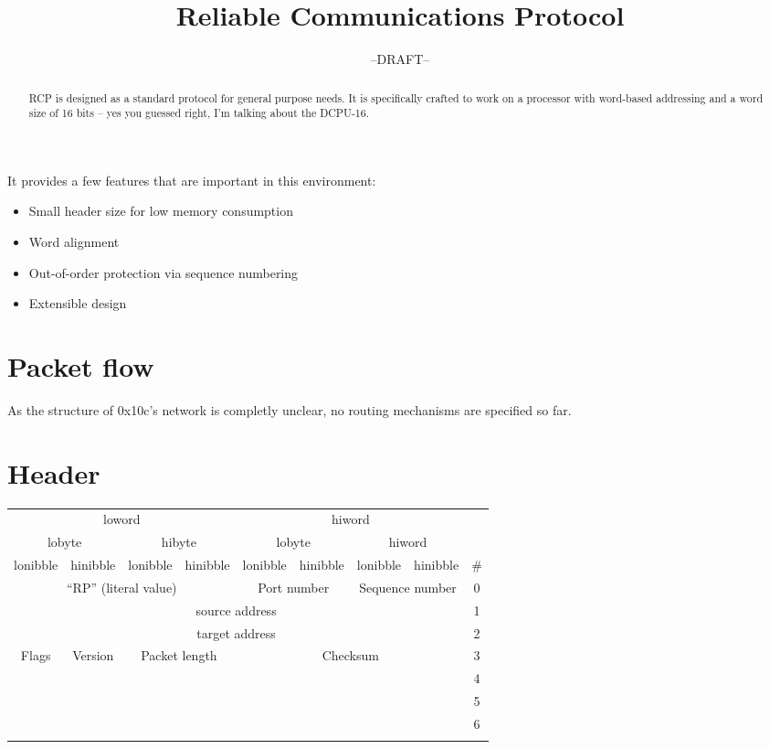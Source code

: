 \documentclass[12pt,a4paper,english,DIV=15,oneside,parskip=half]{scrartcl}
\begin{document}
\title{Reliable Communications Protocol}
\author{--DRAFT--}

\maketitle

\begin{abstract}

RCP is designed as a standard protocol for general purpose needs. It is specifically crafted to work on a processor with word-based addressing and a word size of 16 bits -- yes you guessed right, I\rq{}m talking about the DCPU-16.

\end{abstract}

It provides a few features that are important in this environment:
\begin{itemize}
\item Small header size for low memory consumption
\item Word alignment
\item Out-of-order protection via sequence numbering
\item Extensible design
\end{itemize}

\section{Packet flow}

As the structure of 0x10c\rq{}s network is completly unclear, no routing mechanisms are specified so far.

\section{Header}

\begin{tabular}{|c|c|c|c|c|c|c|c|c|}
\cline{1-8} 
\multicolumn{4}{|c|}{loword} & \multicolumn{4}{c|}{hiword} & \multicolumn{1}{c}{}\tabularnewline
\cline{1-8} 
\multicolumn{2}{|c|}{lobyte} & \multicolumn{2}{c|}{hibyte} & \multicolumn{2}{c|}{lobyte} & \multicolumn{2}{c|}{hiword} & \multicolumn{1}{c}{}\tabularnewline
\hline 
lonibble & hinibble & lonibble & hinibble & lonibble & hinibble & lonibble & hinibble & \#\tabularnewline
\hline 
\multicolumn{4}{|c|}{``RP'' (literal value)} & \multicolumn{2}{c|}{Port number} & \multicolumn{2}{c|}{Sequence number} & 0\tabularnewline
\hline 
\multicolumn{8}{|c|}{source address} & 1\tabularnewline
\hline 
\multicolumn{8}{|c|}{target address} & 2\tabularnewline
\hline 
Flags & Version & \multicolumn{2}{c|}{Packet length} & \multicolumn{4}{c|}{Checksum} & 3\tabularnewline
\hline 
 &  &  &  &  &  &  &  & 4\tabularnewline
\hline 
 &  &  &  &  &  &  &  & 5\tabularnewline
\hline 
 &  &  &  &  &  &  &  & 6\tabularnewline
\hline 
 &  &  &  &  &  &  &  & \tabularnewline
\cline{1-1} \cline{9-9} 
\end{tabular}
\end{document}
